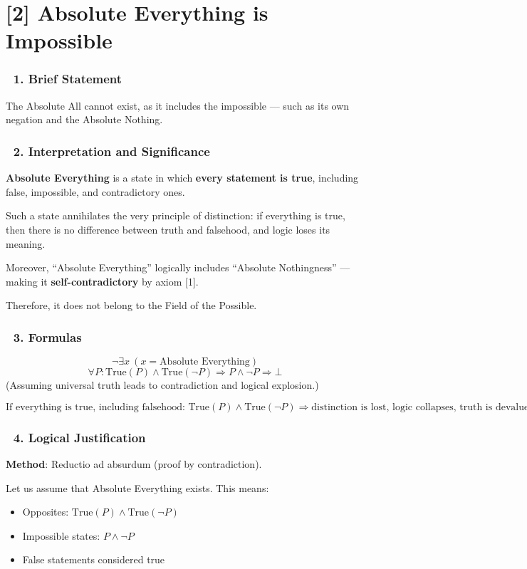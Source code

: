 \documentclass[12pt]{article}
\begin{document}
\section*{[2] Absolute Everything is Impossible}

\subsubsection*{🔹 1. Brief Statement}
The Absolute All cannot exist, as it includes the impossible — such as its own negation and the Absolute Nothing.

\subsubsection*{🔹 2. Interpretation and Significance}
\textbf{Absolute Everything} is a state in which \textbf{every statement is true}, including false, impossible, and contradictory ones.

Such a state annihilates the very principle of distinction: if everything is true, then there is no difference between truth and falsehood, and logic loses its meaning.

Moreover, ``Absolute Everything'' logically includes ``Absolute Nothingness'' — making it \textbf{self-contradictory} by axiom [1].

Therefore, it does not belong to the Field of the Possible.

\subsubsection*{🔹 3. Formulas}
\[
\neg \exists x\ (x = \text{Absolute Everything})
\]
\[
\forall P: \text{True}(P) \wedge \text{True}(\neg P) \Rightarrow P \wedge \neg P \Rightarrow \bot
\]
(Assuming universal truth leads to contradiction and logical explosion.)

\[
\text{If everything is true, including falsehood: } \text{True}(P) \wedge \text{True}(\neg P) \Rightarrow \text{distinction is lost, logic collapses, truth is devalued.}
\]

\subsubsection*{🔹 4. Logical Justification}
\textbf{Method}: Reductio ad absurdum (proof by contradiction).

Let us assume that Absolute Everything exists. This means:

\begin{itemize}
\item Opposites: $\text{True}(P) \wedge \text{True}(\neg P)$
\item Impossible states: $P \wedge \neg P$
\item False statements considered true
\end{itemize}
\end{document}
